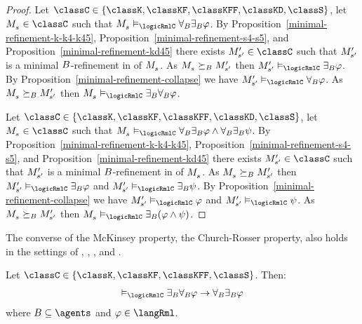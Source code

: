 \begin{proof}
Let $\classC \in \{\classK, \classKF, \classKFF, \classKD, \classS\}$, let $\kPModel{\kStateS} \in \classC$ such that $\kPModel{\kStateS} \entails_\logicRmlC \allrefsBs \somerefsBs \phi$.
By Proposition~\ref{minimal-refinement-k-k4-k45}, Proposition~\ref{minimal-refinement-s4-s5}, and Proposition~\ref{minimal-refinement-kd45} there exists $\kPModelP{\kStateSP} \in \classC$ such that ${M^{\prime}_{{s}^{\prime}}}$ is a minimal $B$-refinement in \classC{} of $\kPModel{\kStateS}$.
As $\kPModel{\kStateS} \simulatesBs \kPModelP{\kStateSP}$ then $\kPModelP{\kStateSP} \entails_\logicRmlC \somerefsBs \phi$.
By Proposition~\ref{minimal-refinement-collapse} we have $\kPModelP{\kStateSP} \entails_\logicRmlC \allrefsBs \phi$.
As $\kPModel{\kStateS} \simulatesBs \kPModelP{\kStateSP}$ then $\kPModel{\kStateS} \entails_\logicRmlC \somerefsBs \allrefsBs \phi$.

Let $\classC \in \{\classK, \classKF, \classKFF, \classKD, \classS\}$, let $\kPModel{\kStateS} \in \classC$ such that $\kPModel{\kStateS} \entails_\logicRmlC \allrefsBs \somerefsBs \phi \land \allrefsBs \somerefsBs \psi$.
By Proposition~\ref{minimal-refinement-k-k4-k45}, Proposition~\ref{minimal-refinement-s4-s5}, and Proposition~\ref{minimal-refinement-kd45} there exists $\kPModelP{\kStateSP} \in \classC$ such that ${M^{\prime}_{{s}^{\prime}}}$ is a minimal $B$-refinement in \classC{} of $\kPModel{\kStateS}$.
As $\kPModel{\kStateS} \simulatesBs \kPModelP{\kStateSP}$ then $\kPModelP{\kStateSP} \entails_\logicRmlC \somerefsBs \phi$ and $\kPModelP{\kStateSP} \entails_\logicRmlC \somerefsBs \psi$.
By Proposition~\ref{minimal-refinement-collapse} we have $\kPModelP{\kStateSP} \entails_\logicRmlC \phi$ and $\kPModelP{\kStateSP} \entails_\logicRmlC \psi$.
As $\kPModel{\kStateS} \simulatesBs \kPModelP{\kStateSP}$ then $\kPModel{\kStateS} \entails_\logicRmlC \somerefsBs (\phi \land \psi)$.
\end{proof}

The converse of the McKinsey property, the Church-Rosser property, also holds in the settings of \classK{}, \classKF{}, \classKFF{}, and \classS{}.

\begin{proposition}\label{rml-church-rosser}
Let $\classC \in \{\classK, \classKF, \classKFF, \classS\}$. Then:
$$
\begin{array}{l}
    \entails_\logicRmlC \somerefsBs \allrefsBs \phi \implies \allrefsBs \somerefsBs \phi
\end{array}
$$
where $\agentsB \subseteq \agents$ and $\phi \in \langRml$.
\end{proposition}

